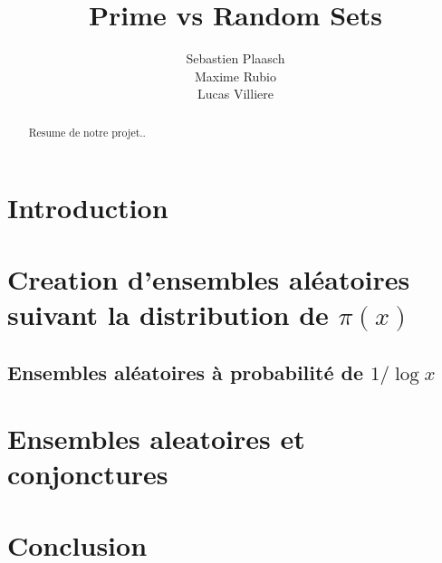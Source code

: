 \documentclass{article}
\begin{document}
\author{Sebastien Plaasch \\ Maxime Rubio  \\ Lucas Villiere}
\title{Prime vs Random Sets}
\maketitle
\newpage 
\begin{abstract}
    Resume de notre projet..
\end{abstract}
\newpage
\tableofcontents


\newpage

\section*{Introduction}
    \label{sec:intro}


\section{Creation d'ensembles aléatoires suivant la distribution de $\pi(x)$}
\subsection{Ensembles aléatoires à probabilité de $1/ \log x$}
    
    

\section{Ensembles aleatoires et conjonctures}
    

\section*{Conclusion}
    

\newpage
\printindex
\end{document}
